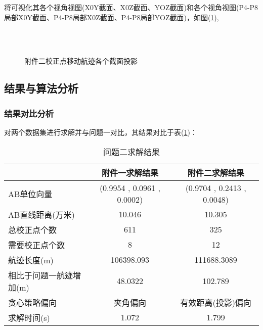 将可视化其各个视角视图(X0Y截面、X0Z截面、YOZ截面)和各个视角视图(P4-P8局部X0Y截面、P4-P8局部X0Z截面、P4-P8局部YOZ截面)，如图(\ref{fig:res-qu2-2-add}),\shuomingxx
\begin{figure}[!htbp]
	\centering
	 \quad
	 \\
     \quad
	 \\
     \quad
	\caption{附件二校正点移动航迹各个截面投影}
	\label{fig:res-qu2-2-add}
\end{figure}

\subsection{结果与算法分析}
\subsubsection{结果对比分析}
对两个数据集进行求解并与问题一对比，其结果对比于表(\ref{tab:qu2-res-all})：
\begin{table}[!htbp]
	\caption{问题二求解结果} 
	\label{tab:qu2-res-all}
	\centering
	\begin{tabular}{lcc} 
		\toprule[1.5pt] 
        & 附件一求解结果       & 附件二求解结果       \\
        \midrule[1pt] 
        AB单位向量        & (0.9954 , 0.0961 , 0.0002) & (0.9704 , 0.2413 , 0.0048) \\
        AB直线距离(万米)    & 10.046                     & 10.305                     \\
        总校正点个数        & 611                        & 325                        \\
        需要校正点个数       & 8                          & 12                         \\
        航迹长度(m)       & 106398.093                 & 111688.3089                \\
        相比于问题一航迹增加(m) & 48.0322                    & 102.789                    \\
        贪心策略偏向        & 夹角偏向                       & 有效距离(投影)偏向                 \\
        求解时间(s)       & 1.072                      & 1.799     \\     
		\bottomrule[1.5pt] 
\end{tabular}\end{table}

